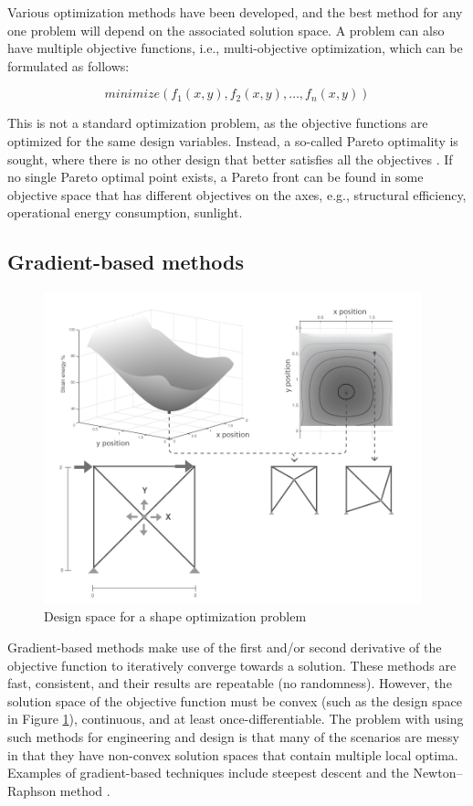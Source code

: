  Various optimization methods have been developed, and the best method for any one problem will depend on the associated solution space. A problem can also have multiple objective functions, i.e., multi-objective optimization, which can be formulated as follows:

\begin{equation*}
minimize(f_1(x,y),f_2(x,y), \dotsc, f_n(x,y))
\end{equation*}

This is not a standard optimization problem, as the objective functions are optimized for the same design variables. Instead, a so-called Pareto optimality is sought, where there is no other design that better satisfies all the objectives \cite{christensen2008introduction}. If no single Pareto optimal point exists, a Pareto front can be found in some objective space that has different objectives on the axes, e.g., structural efficiency, operational energy consumption, sunlight.

\subsection{Gradient-based methods}
\begin{figure}
  \includegraphics[width=310pt]{graphics/designspace.png}
  \caption{Design space for a shape optimization problem}
  \label{fig:designspace}
\end{figure}

Gradient-based methods make use of the first and/or second derivative of the objective function to iteratively converge towards a solution. These methods are fast, consistent, and their results are repeatable (no randomness). However, the solution space of the objective function must be convex (such as the design space in Figure \ref{fig:designspace}), continuous, and at least once-differentiable. The problem with using such methods for engineering and design is that many of the scenarios are messy \cite{schlaich2006challenges} in that they have non-convex solution spaces that contain multiple local optima. Examples of gradient-based techniques include steepest descent and the Newton--Raphson method \cite{christensen2008introduction}. 

